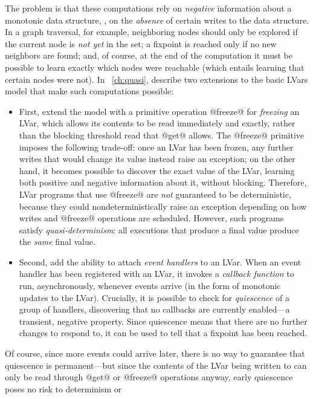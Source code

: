 The problem is that these computations rely on \emph{negative}
information about a monotonic data structure, \ie, on the
\emph{absence} of certain writes to the data structure.  In a graph
traversal, for example, neighboring nodes should only be explored if
the current node is \emph{not yet} in the set; a fixpoint is reached
only if no new neighbors are found; and, of course, at the end of the
computation it must be possible to learn exactly which nodes were
reachable (which entails learning that certain nodes were not).  In ~\ref{ch:quasi},  describe two extensions to the basic LVars
model that make such computations possible:
\begin{itemize}
\item First,  extend the model with a primitive operation @freeze@
  for \emph{freezing} an LVar, which allows its contents to be read
  immediately and exactly, rather than the blocking threshold read
  that @get@ allows.  The @freeze@ primitive imposes the following
  trade-off: once an LVar has been frozen, any further writes that
  would change its value instead raise an exception; on the other
  hand, it becomes possible to discover the exact value of the LVar,
  learning both positive and negative information about it, without
  blocking.  Therefore, LVar programs that use @freeze@ are \emph{not}
  guaranteed to be deterministic, because they could
  nondeterministically raise an exception depending on how writes and
  @freeze@ operations are scheduled.  However, such programs satisfy
  \emph{quasi-determinism}: all executions that produce a final value
  produce the \emph{same} final value.
\item Second,  add the ability to attach \emph{event handlers} to an
  LVar.  When an event handler has been registered with an LVar, it
  invokes a \emph{callback function} to run, asynchronously, whenever
  events arrive (in the form of monotonic updates to the LVar).
  Crucially, it is possible to check for \emph{quiescence} of a group
  of handlers, discovering that no callbacks are currently enabled---a
  transient, negative property.  Since quiescence means that there are
  no further changes to respond to, it can be used to tell that a
  fixpoint has been reached.
\end{itemize}
Of course, since more events could arrive later, there is no way to
guarantee that quiescence is permanent---but since the contents of the
LVar being written to can only be read through @get@ or @freeze@
operations anyway, early quiescence poses no risk to determinism or
